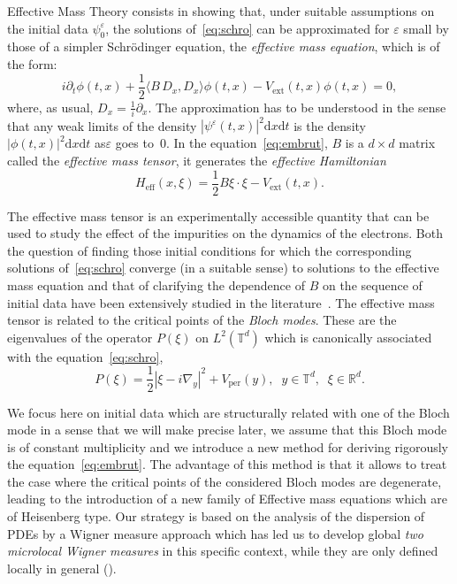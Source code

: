 \documentclass[AHL,Unicode,longabstracts]{cedram}
\DeclareMathOperator{\ext}{ext}
\DeclareMathOperator{\per}{per}
\DeclareMathOperator{\eff}{eff}
\newcommand*\R{{\mathbb R}}
\newcommand*\T{{\mathbb T}}
\newcommand*\eps{\varepsilon}
\numberwithin{equation}{section}
\newcommand*{\dd}{\mathrm{d}}
\newcommand*{\dt}{\dd t}
\newcommand*{\dx}{\dd x}
\begin{document}



Effective Mass Theory consists in showing that, under suitable assumptions on the initial data $\psi^\eps_0$, the solutions of~\eqref{eq:schro} can be approximated for $\eps$ small by those of a simpler Schr\"odinger equation, the \emph{effective mass equation}, which is of the form:
\begin{equation}\label{eq:embrut}
i\partial_t \phi (t,x)+\dfrac{1}{2}\langle B\, D_x,D_x\rangle\phi(t,x) - V_{\ext}(t,x)\phi(t,x)=0,
\end{equation}
where, as usual, $D_x=\frac{1}{i}\partial_x$. The approximation has to be understood in the sense that any weak limits of the density $|\psi^\eps(t,x)|^2\dx\dt$ is the density $|\phi(t,x)|^2\dx\dt$ as\linebreak $\eps$ goes to~$0$. In the equation~\eqref{eq:embrut}, $B$ is a $d\times d$ matrix called the \emph{effective mass tensor}, it generates the \emph{effective Hamiltonian}
\[
H_{\eff}(x,\xi) = \frac{1}{2}B\xi\cdot \xi -V_{\ext}(t,x).
\]

The effective mass tensor is an experimentally accessible quantity that can be used to study the effect of the impurities on the dynamics of the electrons. Both the question of finding those initial conditions for which the corresponding solutions of~\eqref{eq:schro} converge (in a suitable sense) to solutions to the effective mass equation and that of clarifying the dependence of $B$ on the sequence of initial data have been extensively studied in the literature~\cite{AP05,BBA11,BLP78,HW11,PR96}. The effective mass tensor is related to the critical points of the \emph{Bloch modes}. These are the eigenvalues of the operator $P(\xi)$ on $L^2(\T^d)$ which is canonically associated with the equation~\eqref{eq:schro},
\begin{equation}\label{def:P}
P(\xi)=\frac{1}{2} |\xi-i\nabla_y|^2 +V_{\per}(y),\;\; y\in\T^d,\;\;\xi\in\R^d.
\end{equation}

We focus here on initial data which are structurally related with one of the Bloch mode in a sense that we will make precise later, we assume that this Bloch mode is of constant multiplicity and we introduce a new method for deriving rigorously the equation~\eqref{eq:embrut}. The advantage of this method is that it allows to treat the case where the critical points of the considered Bloch modes are degenerate, leading to the introduction of a new family of Effective mass equations which are of Heisenberg type. Our strategy is based on the analysis of the dispersion of PDEs by a Wigner measure approach which has led us to develop global \emph{two microlocal Wigner measures} in this specific context, while they are only defined locally in general (\cite{F2micro:00,F2micro:05}).
\end{document}
